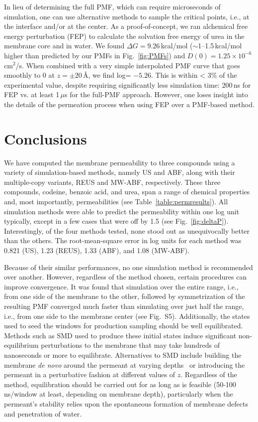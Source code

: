 \par In lieu of determining the full PMF, which can require microseconds of simulation, one can use alternative methods to sample the critical points, i.e., at the interface and/or at the center.  As a proof-of-concept, we ran alchemical free energy perturbation (FEP) to calculate the solvation free energy of urea in the membrane core and in water.  We found $\Delta G = 9.26$\,kcal/mol ($\sim$1--1.5\,kcal/mol higher than predicted by our PMFs in Fig.~\ref{fig:PMFs}) and $D(0) = 1.25\times 10^{-6}$\,cm$^2$/s.  When combined with a very simple interpolated PMF curve that goes smoothly to 0 at $z=\pm20$\,\AA, we find log\perm = $-5.26$.  This is within < 3\% of the experimental value, despite requiring significantly less simulation time: 200\,ns for FEP vs. at least 1\,$\mu$s for the full-PMF approach.  However, one loses insight into the details of the permeation process when using FEP over a PMF-based method.




\section{Conclusions}

We have computed the membrane permeability to three compounds using a variety of simulation-based methods, namely US and ABF, along with their multiple-copy variants, REUS and MW-ABF, respectively.  These three compounds, codeine, benzoic acid, and urea, span a range of chemical properties and, most importantly, permeabilities (see Table~\ref{table:permresults}).  All simulation methods were able to predict the permeability within one log unit typically, except in a few cases that were off by 1.5 (see Fig.~\ref{fig:deltaP}).  Interestingly, of the four methods tested, none stood out as unequivocally better than the others.  The root-mean-square error in log units for each method was 0.821 (US), 1.23 (REUS), 1.33 (ABF), and 1.08 (MW-ABF).

Because of their similar performances, no one simulation method is recommended over another.  However, regardless of the method chosen, certain procedures can improve convergence.   It was found that simulation over the entire range, i.e., from one side of the membrane to the other, followed by symmetrization of the resulting PMF converged much faster than simulating over just half the range, i.e., from one side to the membrane center (see Fig.~S5).  Additionally, the states used to seed the windows for production sampling should be well equilibrated.  Methods such as SMD used to produce these initial states induce significant non-equilibrium perturbations to the membrane that may take hundreds of nanoseconds or more to equilibrate.  Alternatives to SMD include building the membrane {\it de novo} around the permeant at varying depths~\cite{Dorairaj2007} or introducing the permeant in a perturbative fashion at different values of $z$.  Regardless of the method, equilibration should be carried out for as long as is feasible (50-100\,ns/window at least, depending on membrane depth), particularly when the permeant's stability relies upon the spontaneous formation of membrane defects and penetration of water.

